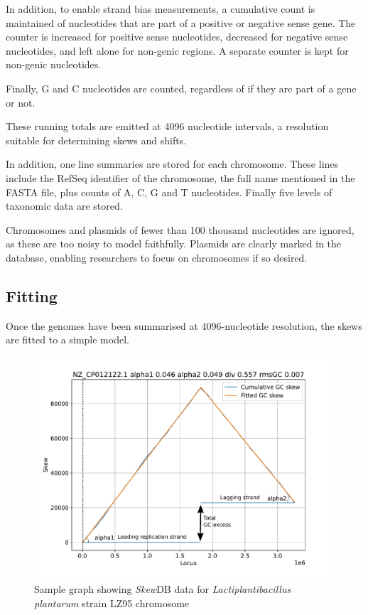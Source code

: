 \documentclass[fleqn,10pt]{wlscirep}
\begin{document}
In addition, to enable strand bias measurements, a cumulative count is maintained of nucleotides that are part of a positive or negative sense gene. The counter is increased for positive sense nucleotides, decreased for negative sense nucleotides, and left alone for non-genic regions. A separate counter is kept for non-genic nucleotides. 

Finally, G and C nucleotides are counted, regardless of if they are part of a gene or not.

These running totals are emitted at 4096 nucleotide intervals, a resolution suitable for determining skews and shifts.

In addition, one line summaries are stored for each chromosome. These lines include the RefSeq identifier of the chromosome, the full name mentioned in the FASTA file, plus counts of A, C, G and T nucleotides. Finally five levels of taxonomic data are stored.

Chromosomes and plasmids of fewer than 100 thousand nucleotides are ignored, as these are too noisy to model faithfully. Plasmids are clearly marked in the database, enabling researchers to focus on chromosomes if so desired.

\subsection*{Fitting}
Once the genomes have been summarised at 4096-nucleotide resolution, the skews are fitted to a simple model.

\begin{figure}[ht]
\centering
\includegraphics[width=0.7\linewidth]{explainer.pdf}
\caption{Sample graph showing \emph{Skew}DB data for \emph{Lactiplantibacillus plantarum} strain LZ95 chromosome}
\label{fig:explainer-graph}
\end{figure}
\end{document}

